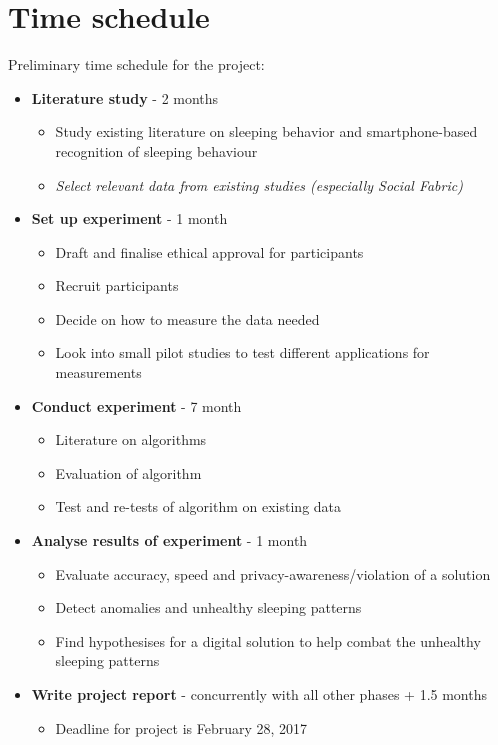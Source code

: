 \documentclass[12pt]{article}
\begin{document}
\section{Time schedule}
Preliminary time schedule for the project:
	\begin{itemize}
		\item \textbf{Literature study} - 2 months
			\begin{itemize}
				\item Study existing literature on sleeping behavior and smartphone-based recognition of sleeping behaviour
				\item \textit{Select relevant data from existing studies (especially Social Fabric)}
			\end{itemize}	
		\item \textbf{Set up experiment} - 1 month
			\begin{itemize}
				\item Draft and finalise ethical approval for participants 
				\item Recruit participants
				\item Decide on how to measure the data needed
				\item Look into small pilot studies to test different applications for measurements
			\end{itemize}	
		\item \textbf{Conduct experiment} - 7 month
			\begin{itemize}
				\item Literature on algorithms 
				\item Evaluation of algorithm 
				\item Test and re-tests of algorithm on existing data
			\end{itemize}	
		\item \textbf{Analyse results of experiment} - 1 month
			\begin{itemize}
				\item Evaluate accuracy, speed and privacy-awareness/violation of a solution
				\item Detect anomalies and unhealthy sleeping patterns
				\item Find hypothesises for a digital solution to help combat the unhealthy sleeping 
				patterns   
			\end{itemize}	
		\item \textbf{Write project report} - concurrently with all other phases + 1.5 months
			\begin{itemize}
				\item Deadline for project is February 28, 2017
			\end{itemize}	
	\end{itemize}

%




\end{document}
